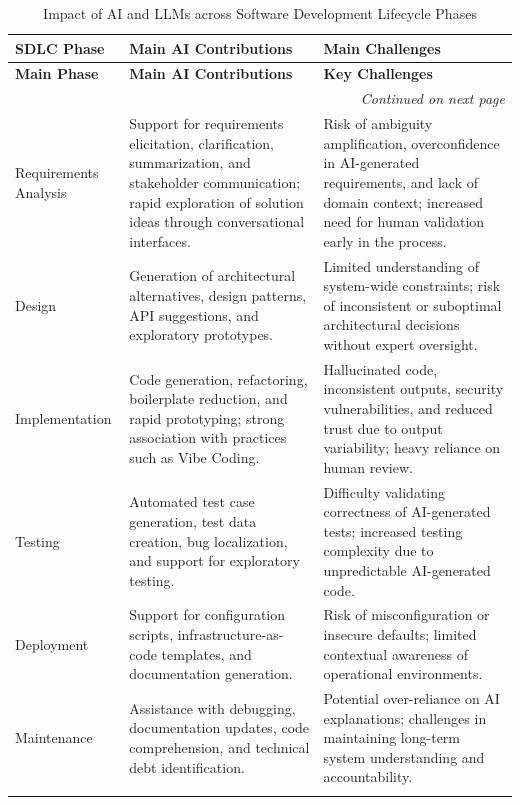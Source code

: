 {\small
\begin{longtable}{p{2.3cm} p{5.8cm} p{6.5cm}}
\caption{Impact of AI and LLMs across Software Development Lifecycle Phases}
\label{tab:ai_sdlc_mapping} \\

\toprule
\textbf{SDLC Phase} & \textbf{Main AI Contributions} & \textbf{Main Challenges} \\
\midrule
\endfirsthead

\midrule
\textbf{Main Phase} & \textbf{Main AI Contributions} & \textbf{Key Challenges} \\
\midrule
\endhead

\midrule
\multicolumn{3}{r}{\textit{Continued on next page}}\\
\bottomrule
\endfoot

\bottomrule
\endlastfoot

Requirements Analysis &
Support for requirements elicitation, clarification, summarization, and stakeholder communication; rapid exploration of solution ideas through conversational interfaces. &
Risk of ambiguity amplification, overconfidence in AI-generated requirements, and lack of domain context; increased need for human validation early in the process. \\
\addlinespace

Design &
Generation of architectural alternatives, design patterns, API suggestions, and exploratory prototypes. &
Limited understanding of system-wide constraints; risk of inconsistent or suboptimal architectural decisions without expert oversight. \\
\addlinespace

Implementation &
Code generation, refactoring, boilerplate reduction, and rapid prototyping; strong association with practices such as Vibe Coding. &
Hallucinated code, inconsistent outputs, security vulnerabilities, and reduced trust due to output variability; heavy reliance on human review. \\
\addlinespace

Testing &
Automated test case generation, test data creation, bug localization, and support for exploratory testing. &
Difficulty validating correctness of AI-generated tests; increased testing complexity due to unpredictable AI-generated code. \\
\addlinespace

Deployment &
Support for configuration scripts, infrastructure-as-code templates, and documentation generation. &
Risk of misconfiguration or insecure defaults; limited contextual awareness of operational environments. \\
\addlinespace

Maintenance &
Assistance with debugging, documentation updates, code comprehension, and technical debt identification. &
Potential over-reliance on AI explanations; challenges in maintaining long-term system understanding and accountability. \\
\addlinespace

\end{longtable}
}


